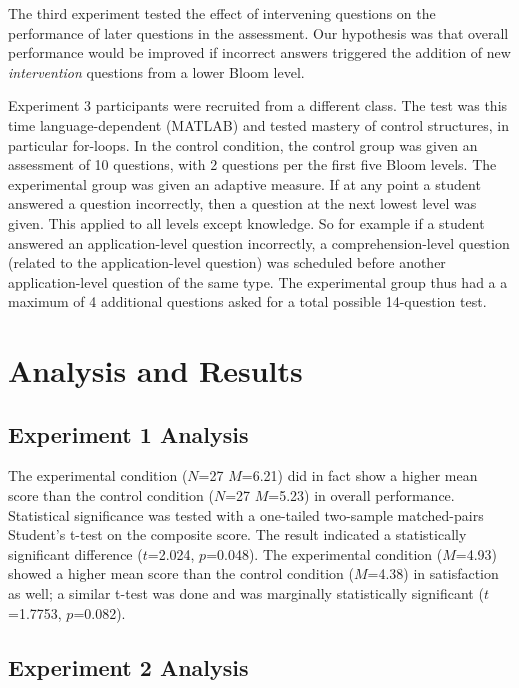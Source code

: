 The third experiment tested the effect of intervening questions on the
performance of later questions in the assessment.  Our hypothesis was that
overall performance would be improved if incorrect answers triggered the
addition of new {\em intervention} questions from a lower Bloom level.

Experiment 3 participants were recruited from a different class. The test was
this time language-dependent (MATLAB) and tested mastery of control structures,
in particular for-loops.  In the control condition, the control group was given
an assessment of 10 questions, with 2 questions per the first five Bloom
levels. The experimental group was given an adaptive measure.  If at any point
a student answered a question incorrectly, then a question at the next lowest
level was given.  This applied to all levels except knowledge.  So for example
if a student answered an application-level question incorrectly, a
comprehension-level question (related to the application-level question) was
scheduled before another application-level question of the same type.  The
experimental group thus had a a maximum of 4 additional questions asked for a
total possible 14-question test.

\section{Analysis and Results}

\subsection{Experiment 1 Analysis} 

The experimental condition ($N$=27 $M$=6.21) did in fact show a higher mean
score than the control condition ($N$=27 $M$=5.23) in overall performance.
Statistical significance was tested with a one-tailed two-sample matched-pairs
Student's t-test on the composite score. The result indicated a statistically
significant difference ($t$=2.024, $p$=0.048).  The experimental condition
($M$=4.93) showed a higher mean score than the control condition ($M$=4.38) in
satisfaction as well; a similar t-test was done and was marginally
statistically significant ($t$=1.7753, $p$=0.082).  


\subsection{Experiment 2 Analysis} 

